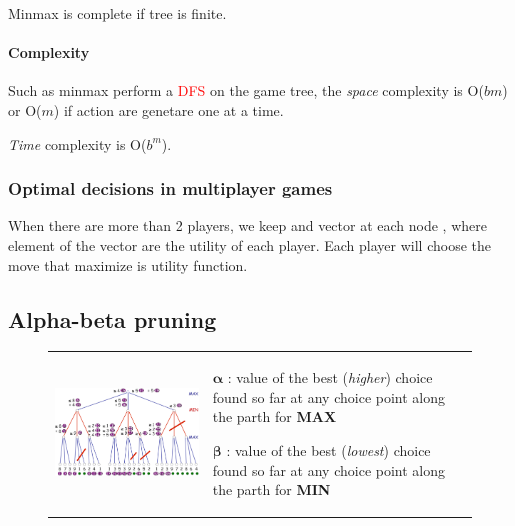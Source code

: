 Minmax is complete if tree is finite.

\paragraph{Complexity} 
Such as minmax perform a \textcolor{red}{DFS} on the game tree, the \textit{space} complexity is O($bm$) 
or O($m$) if action are genetare one at a time.

\textit{Time} complexity is O($b^m$).

\subsubsection{Optimal decisions in multiplayer games}
When there are more than 2 players, we keep and vector at each node , where element of the vector are the 
utility of each player. Each player will choose the move that maximize is utility function.

\subsection{Alpha-beta pruning}
\begin{figure}[h]
\begin{tabular}{m{10cm}m{6cm}}
    \centering
    \includegraphics[width=10cm]{minmax_ex.png}
&

\begin{description}
    \item $\mathbf{\alpha}$ : value of the best (\textit{higher}) choice found
        so far at any choice point along the parth for \textbf{MAX}
    \item $\mathbf{\beta}$ : value of the best (\textit{lowest}) choice found
    so far at any choice point along the parth for \textbf{MIN}
\end{description}
\end{tabular}
\end{figure}


